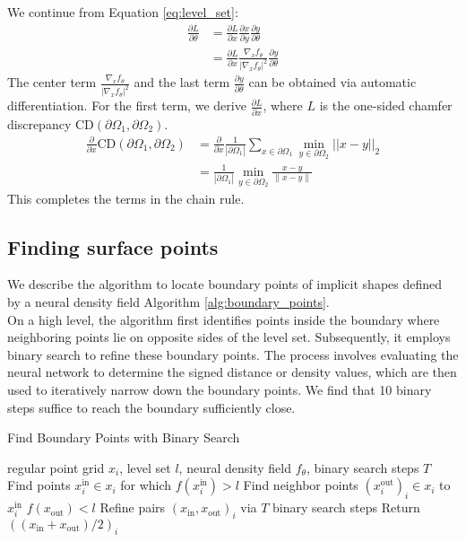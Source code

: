 We continue from Equation \ref{eq:level_set}:
\begin{align}
    \frac{\partial L}{\partial \theta} &= \frac{\partial L}{\partial x} \frac{\partial x}{\partial y} \frac{\partial y}{\partial \theta} \nonumber \\ 
    &= \frac{\partial L}{\partial x} \frac{\nabla_x f_\theta}{|\nabla_x f_\theta|^2} \frac{\partial y}{\partial \theta}
\end{align}
The center term $\frac{\nabla_x f_\theta}{|\nabla_x f_\theta|^2}$ and the last term  $\frac{\partial y}{\partial \theta}$ can be obtained via automatic differentiation.
For the first term, we derive $\frac{\partial L}{\partial x}$, where $L$ is the one-sided chamfer discrepancy $\text{CD}(\partial \Omega_1, \partial \Omega_2)$.
\begin{align}
\frac{\partial}{\partial x}  \text{CD}(\partial \Omega_1, \partial \Omega_2)
&= \frac{\partial }{\partial x} \frac{1}{\left| \partial \Omega_1 \right|} \sum_{x \in \partial \Omega_1} \min_{y \in \partial \Omega_2} ||x-y||_2
\\
&= \frac{1}{\left| \partial \Omega_1 \right|} \min_{y \in \partial \Omega_2} \frac{x - y}{\|x - y\|}
\end{align}
This completes the terms in the chain rule.

\subsection{Finding surface points}
We describe the algorithm to locate boundary points of implicit shapes defined by a neural density field Algorithm \ref{alg:boundary_points}. \\
On a high level, the algorithm first identifies points inside the boundary where neighboring points lie on opposite sides of the level set.
Subsequently, it employs binary search to refine these boundary points.
The process involves evaluating the neural network to determine the signed distance or density values, which are then used to iteratively narrow down the boundary points.
We find that 10 binary steps suffice to reach the boundary sufficiently close.

\begin{algorithm}[h]
\caption{Find Boundary Points with Binary Search}
\label{alg:boundary_points}
\begin{algorithmic}
regular point grid $x_i$, level set $l$, neural density field $f_\theta$, binary search steps $T$
\STATE Find points $x_i^\text{in} \in x_i$ for which $f(x_i^\text{in}) > l$
\STATE Find neighbor points $(x_i^\text{out})_i \in x_i$ to $x_i^\text{in}$ $f(x_\text{out}) < l$ 
\STATE Refine pairs $(x_\text{in}, x_\text{out})_i$ via $T$ binary search steps
\STATE Return $((x_\text{in} + x_\text{out})/2)_i$
\end{algorithmic}
\end{algorithm}
